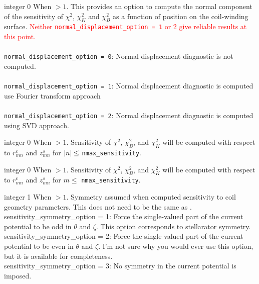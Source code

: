 \myhrule

{integer}
{0}
{When  $>1$.}
{This provides an option to compute the normal component of the sensitivity of $\chi^2$, $\chi^2_K$ and $\chi^2_B$ as a function of position on the coil-winding surface. \textcolor{red}{Neither \texttt{normal\_displacement\_option = 1} or 2 give reliable results at this point.} \\ \\ 
\texttt{normal\_displacement\_option = 0}: Normal displacement diagnostic is not computed. \\ \\
\texttt{normal\_displacement\_option = 1}: Normal displacement diagnostic is computed use Fourier transform approach \\ \\
\texttt{normal\_displacement\_option = 2}: Normal displacement diagnostic is computed using SVD approach.}

\myhrule

{integer}
{0}
{When  $> 1$.}
{Sensitivity of $\chi^2$, $\chi^2_B$, and $\chi^2_K$ will be computed with respect to $r_{mn}^c$ and $z_{mn}^s$ for $\abs{n} \leq $ \texttt{nmax\_sensitivity}.}

\myhrule

{integer}
{0}
{When  $> 1$.}
{Sensitivity of $\chi^2$, $\chi^2_B$, and $\chi^2_K$ will be computed with respect to $r_{mn}^c$ and $z_{mn}^s$ for $m \leq $ \texttt{nmax\_sensitivity}.}

\myhrule

{integer}
{1}
{When  $> 1$.}
{Symmetry assumed when computed sensitivity to coil geometry parameters. This does not need to be the same as . \\
{\ttfamily sensitivity\_symmetry\_option} = 1: Force the single-valued part of the current potential
to be odd in $\theta$ and $\zeta$. This option corresponds to stellarator symmetry.\\

{\ttfamily sensitivity\_symmetry\_option} = 2: Force the single-valued part of the current potential
to be even in $\theta$ and $\zeta$. I'm not sure why you would ever use this option,
but it is available for completeness.\\

{\ttfamily sensitivity\_symmetry\_option} = 3: No symmetry in the current potential is imposed.
}

